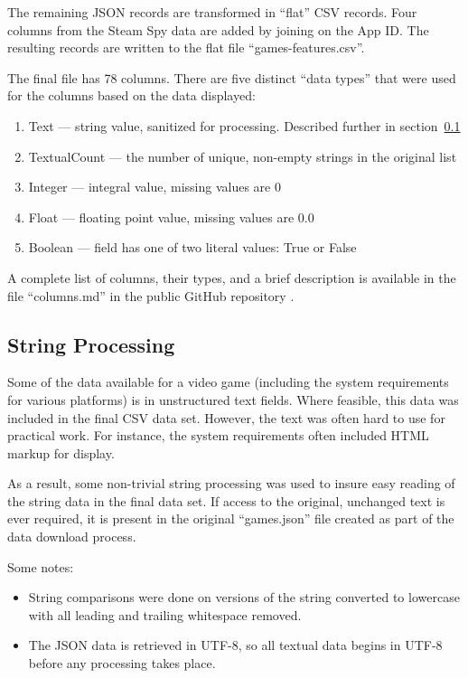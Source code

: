 \documentclass[letterpaper,10pt,twocolumn]{article}
\begin{document}
The remaining JSON records are transformed in ``flat'' CSV records. Four
columns from the Steam Spy data are added by joining on the App ID\@. The
resulting records are written to the flat file ``games-features.csv''.

The final file has 78 columns. There are five distinct ``data types'' that
were used for the columns based on the data displayed:

\begin{enumerate}
    \item Text --- string value, sanitized for processing. Described further in
    section~\ref{data-strings}
    \item TextualCount --- the number of unique, non-empty strings in the original list
    \item Integer --- integral value, missing values are 0
    \item Float --- floating point value, missing values are 0.0
    \item Boolean --- field has one of two literal values: True or False
\end{enumerate}

A complete list of columns, their types, and a brief description is
available in the file ``columns.md'' in the public GitHub repository
\cite{our-columns}.

\subsection{String Processing}

\label{data-strings}

Some of the data available for a video game (including the system requirements
for various platforms) is in unstructured text fields. Where feasible, this data
was included in the final CSV data set. However, the text was often hard to use
for practical work. For instance, the system requirements often included HTML
markup for display.

As a result, some non-trivial string processing was used to insure easy reading
of the string data in the final data set. If access to the original, unchanged
text is ever required, it is present in the original ``games.json'' file created
as part of the data download process.

Some notes:

\begin{itemize}
    \item String comparisons were done on versions of the string converted to
    lowercase with all leading and trailing whitespace removed.
    \item The JSON data is retrieved in UTF-8, so all textual data begins in
    UTF-8 before any processing takes place.
\end{itemize}
\end{document}
